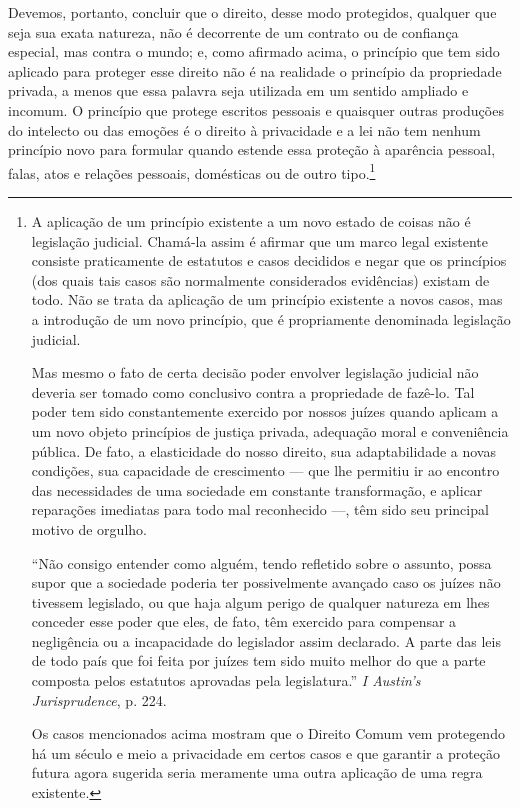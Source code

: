 Devemos, portanto, concluir que o direito, desse modo protegidos,
qualquer que seja sua exata natureza, não é decorrente de um contrato ou
de confiança especial, mas contra o mundo; e, como afirmado acima, o
princípio que tem sido aplicado para proteger esse direito não é na
realidade o princípio da propriedade privada, a menos que essa palavra
seja utilizada em um sentido ampliado e incomum. O princípio que protege
escritos pessoais e quaisquer outras produções do intelecto ou das
emoções é o direito à privacidade e a lei não tem nenhum princípio novo
para formular quando estende essa proteção à aparência pessoal, falas,
atos e relações pessoais, domésticas ou de outro tipo.\footnote{A
  aplicação de um princípio existente a um novo estado de coisas não é
  legislação judicial. Chamá-la assim é afirmar que um marco legal
  existente consiste praticamente de estatutos e casos decididos e negar
  que os princípios (dos quais tais casos são normalmente considerados
  evidências) existam de todo. Não se trata da aplicação de um princípio
  existente a novos casos, mas a introdução de um novo princípio, que é
  propriamente denominada legislação judicial.

  Mas mesmo o fato de certa decisão poder envolver legislação judicial
  não deveria ser tomado como conclusivo contra a propriedade de
  fazê-lo. Tal poder tem sido constantemente exercido por nossos juízes
  quando aplicam a um novo objeto princípios de justiça privada,
  adequação moral e conveniência pública. De fato, a elasticidade do
  nosso direito, sua adaptabilidade a novas condições, sua capacidade de
  crescimento --- que lhe permitiu ir ao encontro das necessidades de
  uma sociedade em constante transformação, e aplicar reparações
  imediatas para todo mal reconhecido ---, têm sido seu principal motivo
  de orgulho.

  ``Não consigo entender como alguém, tendo refletido sobre o assunto,
  possa supor que a sociedade poderia ter possivelmente avançado caso os
  juízes não tivessem legislado, ou que haja algum perigo de qualquer
  natureza em lhes conceder esse poder que eles, de fato, têm exercido
  para compensar a negligência ou a incapacidade do legislador assim
  declarado. A parte das leis de todo país que foi feita por juízes tem
  sido muito melhor do que a parte composta pelos estatutos aprovadas
  pela legislatura.'' \emph{I Austin's Jurisprudence}, p. 224.

  Os casos mencionados acima mostram que o Direito Comum vem protegendo
  há um século e meio a privacidade em certos casos e que garantir a
  proteção futura agora sugerida seria meramente uma outra aplicação de
  uma regra existente.}

